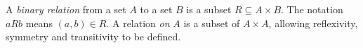 
A \emph{binary relation} from a set $A$ to a set $B$ is a subset $R\subseteq A\times B$. The notation $aRb$ means $(a,b)\in R$. A relation \emph{on} $A$ is a subset of $A\times A$, allowing reflexivity, symmetry and transitivity to be defined.
